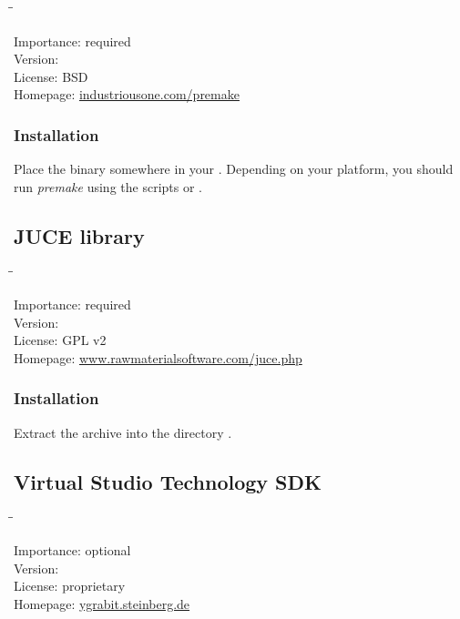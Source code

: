 \begin{tabbing}
  \hspace*{6em}\=\=\kill

  Importance:  \> required \\
  Version:      \\
  License:     \> BSD \\
  Homepage:    \> \href{http://industriousone.com/premake}{industriousone.com/premake}
\end{tabbing}

\subsubsection{Installation}

Place the binary somewhere in your .  Depending on your
platform, you should run \emph{premake} using the scripts
 or .

\subsection{JUCE library}

\begin{tabbing}
  \hspace*{6em}\=\=\kill

  Importance:  \> required \\
  Version:      \\
  License:     \> GPL v2 \\
  Homepage:    \> \href{http://www.rawmaterialsoftware.com/juce.php}{www.rawmaterialsoftware.com/juce.php}
\end{tabbing}

\subsubsection{Installation}

Extract the archive into the directory .

\subsection{Virtual Studio Technology SDK}

\begin{tabbing}
  \hspace*{6em}\=\=\kill

  Importance:  \> optional \\
  Version:      \\
  License:     \> proprietary \\
  Homepage:    \> \href{http://ygrabit.steinberg.de/}{ygrabit.steinberg.de}
\end{tabbing}

